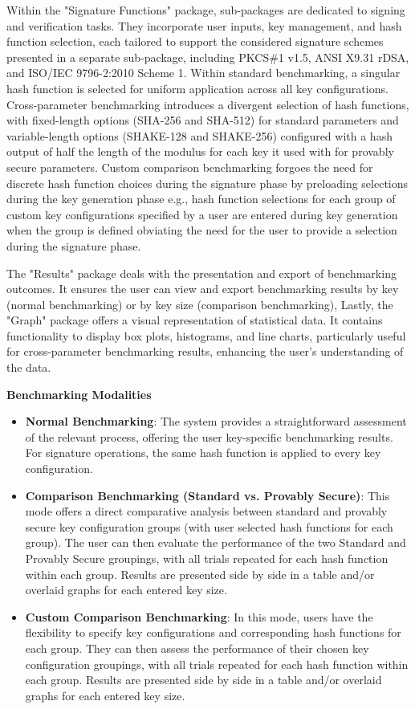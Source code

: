 \documentclass[]{final_report}
\theoremstyle{definition}
\begin{document}
Within the "Signature Functions" package, sub-packages are dedicated to signing and verification tasks. They incorporate user inputs, key management, and hash function selection, each tailored to support the considered signature schemes presented in a separate sub-package, including PKCS\#1 v1.5, ANSI X9.31 rDSA, and ISO/IEC 9796-2:2010 Scheme 1. Within standard benchmarking, a singular hash function is selected for uniform application across all key configurations. Cross-parameter benchmarking introduces a divergent selection of hash functions, with fixed-length options (SHA-256 and SHA-512) for standard parameters and variable-length options (SHAKE-128 and SHAKE-256) configured with a hash output of half the length of the modulus  for each key it used with for provably secure parameters. Custom comparison benchmarking forgoes the need for discrete hash function choices during the signature phase by preloading selections during the key generation phase e.g., hash function selections for each group of custom key configurations specified by a user are entered during key generation when the group is defined obviating the need for the user to provide a selection during the signature phase.

The "Results" package deals with the presentation and export of benchmarking outcomes. It ensures the user can view and export benchmarking results by key (normal benchmarking) or by key size (comparison benchmarking),
Lastly, the "Graph" package offers a visual representation of statistical data. It contains functionality to display box plots, histograms, and line charts, particularly useful for cross-parameter benchmarking results, enhancing the user's understanding of the data.


\textbf{Benchmarking Modalities}

\begin{itemize}
    \item \textbf{Normal Benchmarking}: The system provides a straightforward assessment of the relevant process, offering the user key-specific benchmarking results. For signature operations, the same hash function is applied to every key configuration.
     \item \textbf{Comparison Benchmarking (Standard vs. Provably Secure)}: This mode offers a direct comparative analysis between standard and provably secure key configuration groups (with user selected hash functions for each group). The user can then evaluate the performance of the two Standard and Provably Secure groupings, with all trials repeated for each hash function within each group. Results are presented side by side in a table and/or overlaid graphs for each entered key size.
 \item \textbf{Custom Comparison Benchmarking}: In this mode, users have the flexibility to specify key configurations and corresponding hash functions for each group. They can then assess the performance of their chosen key configuration groupings, with all trials repeated for each hash function within each group. Results are presented side by side in a table and/or overlaid graphs for each entered key size.
\end{itemize}
\end{document}
